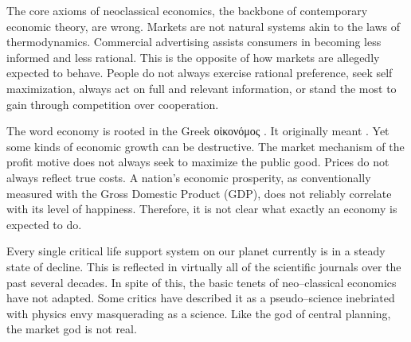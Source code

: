 
The core axioms of neoclassical economics, the backbone of contemporary economic theory, are wrong. Markets are not natural systems akin to the laws of thermodynamics.
\footnotecite[lasn2012]
Commercial advertising assists consumers in becoming less informed and less rational. This is the opposite of how markets are allegedly expected to behave. People do not always exercise rational preference, seek self maximization, always act on full and relevant information, 
or stand the most to gain through competition over cooperation.

The word economy is rooted in the Greek
\begingroup
{}
οἰκονόμος
\endgroup. It originally meant . Yet some kinds of economic growth can be destructive.
\footnotecite[h2oil]
The market mechanism of the profit motive does not always seek to maximize the public good.
Prices do not always reflect true costs.
\footnotecite[roberts2013]
\footnotecite[cobb1999]
\footnotecite[oxfam2004]
\footnotecite[raj2010]
\footnotecite[extras={ See sections 4.6 and 4.11.}][agenda_21]
A nation's economic prosperity, as conventionally measured with the Gross Domestic Product (GDP), does not reliably correlate with its level of happiness.
 Therefore, it is not clear what exactly an economy is expected to do.

Every single critical life support system on our planet currently is in a steady state of decline. This is reflected in virtually all of the scientific journals over the past several decades. In spite of this, the basic tenets of neo--classical economics have not adapted. Some critics have described it as a pseudo--science inebriated with physics envy masquerading as a science. Like the god of central planning, the market god is not real.\footnotecite[extras={, p.~328.}][mcmurtry2013]


